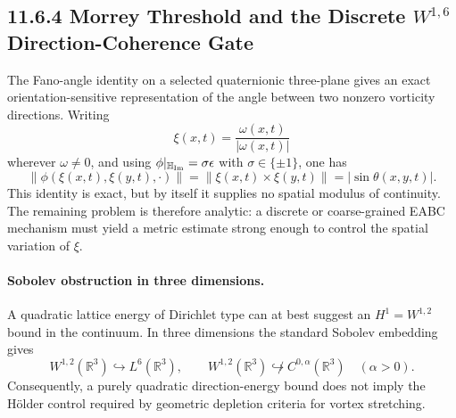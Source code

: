 \documentclass{article}
\begin{document}
\subsection*{11.6.4 Morrey Threshold and the Discrete $W^{1,6}$ Direction-Coherence Gate}
\label{sec:fano-morrey-w16}

The Fano-angle identity on a selected quaternionic three-plane gives an exact
orientation-sensitive representation of the angle between two nonzero
vorticity directions.  Writing
\[
\xi(x,t)=\frac{\omega(x,t)}{|\omega(x,t)|}
\]
wherever $\omega\neq0$, and using
$\phi|_{\mathbb H_{\rm Im}}=\sigma\epsilon$ with $\sigma\in\{\pm1\}$, one has
\begin{equation}
\boxed{
\|\phi(\xi(x,t),\xi(y,t),\cdot)\|
=\|\xi(x,t)\times\xi(y,t)\|
=|\sin\theta(x,y,t)|.
}
\end{equation}
This identity is exact, but by itself it supplies no spatial modulus of
continuity.  The remaining problem is therefore analytic: a discrete or
coarse-grained EABC mechanism must yield a metric estimate strong enough to
control the spatial variation of $\xi$.

\paragraph{Sobolev obstruction in three dimensions.}
A quadratic lattice energy of Dirichlet type can at best suggest an
$H^1=W^{1,2}$ bound in the continuum.  In three dimensions the standard
Sobolev embedding gives
\begin{equation}
W^{1,2}(\mathbb R^3)\hookrightarrow L^6(\mathbb R^3),
\qquad
W^{1,2}(\mathbb R^3)\not\hookrightarrow C^{0,\alpha}(\mathbb R^3)
\quad(\alpha>0).
\end{equation}
Consequently, a purely quadratic direction-energy bound does not imply the
Hölder control required by geometric depletion criteria for vortex stretching.
\end{document}
